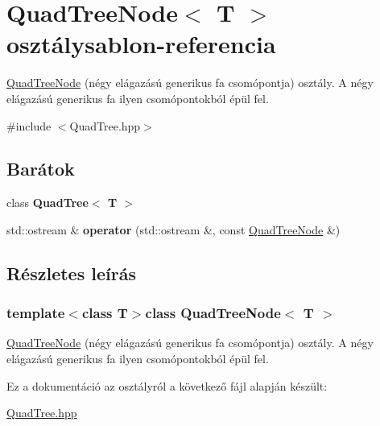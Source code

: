 \hypertarget{class_quad_tree_node}{\section{Quad\-Tree\-Node$<$ T $>$ osztálysablon-\/referencia}
\label{class_quad_tree_node}
}


\hyperlink{class_quad_tree_node}{Quad\-Tree\-Node} (négy elágazású generikus fa csomópontja) osztály. A négy elágazású generikus fa ilyen csomópontokból épül fel.  




{\ttfamily \#include $<$Quad\-Tree.\-hpp$>$}

\subsection*{Barátok}
\begin{DoxyCompactItemize}
\item 
\hypertarget{class_quad_tree_node_a86cf92e1bfbee775eead8ccd7dbdc1f8}{class {\bfseries Quad\-Tree$<$ T $>$}}\label{class_quad_tree_node_a86cf92e1bfbee775eead8ccd7dbdc1f8}

\item 
\hypertarget{class_quad_tree_node_ac25992d68676ddc77fb4702cc5f37338}{std\-::ostream \& {\bfseries operator} (std\-::ostream \&, const \hyperlink{class_quad_tree_node}{Quad\-Tree\-Node} \&)}\label{class_quad_tree_node_ac25992d68676ddc77fb4702cc5f37338}

\end{DoxyCompactItemize}


\subsection{Részletes leírás}
\subsubsection*{template$<$class T$>$class Quad\-Tree\-Node$<$ T $>$}

\hyperlink{class_quad_tree_node}{Quad\-Tree\-Node} (négy elágazású generikus fa csomópontja) osztály. A négy elágazású generikus fa ilyen csomópontokból épül fel. 

Ez a dokumentáció az osztályról a következő fájl alapján készült\-:\begin{DoxyCompactItemize}
\item 
\hyperlink{_quad_tree_8hpp}{Quad\-Tree.\-hpp}\end{DoxyCompactItemize}
